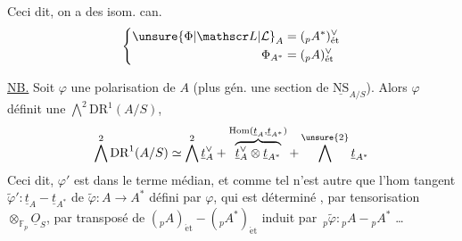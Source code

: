 Ceci dit, on a des isom. can.
\[
\left\{\begin{aligned}
\unsure{\Phi|\mathscr L|\mathcal L}_A&=({}_pA^*)_{\mathrm{\acute et}}^\vee\\
\Phi_{A^*}&=({}_pA)_{\mathrm{\acute et}}^\vee
\end{aligned}\right.
\]

\uline{NB.} Soit $\varphi$ une polarisation de $A$ (plus
gén. une  section de $\underline{\mathrm{NS}}_{A/S}$). Alors
$\varphi$ définit une 
$\bigwedge^2\mathrm{DR}^1(A/S)$, 
\[
\bigwedge^{2}\mathrm{DR}^1(A/S)\simeq\bigwedge^2\underline t_A^\vee+
\overbrace{\underline t_A^\vee\otimes\underline t_{A^*}}^{\operatorname{Hom}(\underline t_A,\underline t_{A^*})}
+\bigwedge^{\unsure{2}}\underline t_{A^*}
\]
Ceci dit, $\varphi'$ est dans le terme médian, et
comme tel n'est autre que l'hom
tangent $\widetilde\varphi':\underline t_A\mathbin{-}\underline t_{A^*}$ de $\widetilde\varphi:A\to A^*$ défini
par $\varphi$, qui est déterminé , par tensorisation
 $\otimes_{\mathbb F_p}\underline O_S$, par
 transposé de
$({}_pA)_{\mathrm{\acute et}}\mathbin{-}({}_pA^*)_{\mathrm{\acute et}}$ induit par $\,{}_p\widetilde\varphi:{}_pA\mathbin{-}{}_pA^*$ \ldots
